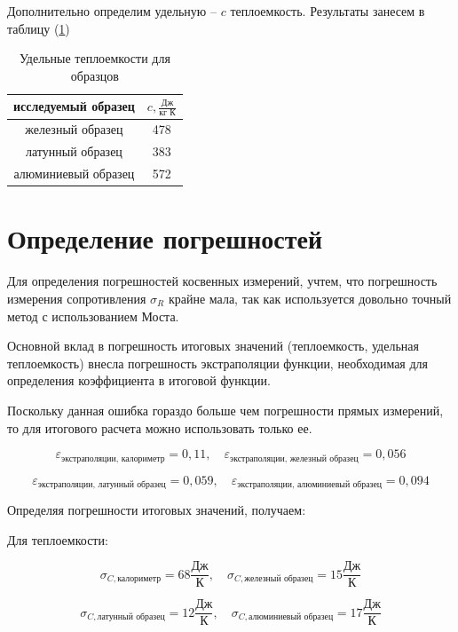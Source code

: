 \documentclass[12pt,a4paper]{article}
\begin{document}
	Дополнительно определим удельную -- $c$  теплоемкость. Результаты занесем в таблицу (\ref{tab:ud_capacity})
	
	\begin{table}[h!]
		\centering
		\begin{tabular}{|c|c|}
		\hline
		исследуемый образец & $c, \frac{\text{Дж}}{\text{кг К}}$ \\ \hline
		железный образец    & 478                           \\ \hline
		латунный образец    & 383                           \\ \hline
		алюминиевый образец & 572                           \\ \hline
		\end{tabular}
		\caption{Удельные теплоемкости для образцов}
		\label{tab:ud_capacity}
	\end{table}	
	
	\section{Определение погрешностей}
	
	Для определения погрешностей косвенных измерений, учтем, что погрешность измерения сопротивления $\sigma_{R}$ крайне мала, так как используется довольно точный метод с использованием Моста.
	
	Основной вклад в погрешность итоговых значений (теплоемкость, удельная теплоемкость) внесла погрешность экстраполяции функции, необходимая для определения коэффициента в итоговой функции.
	
	Поскольку данная ошибка гораздо больше чем погрешности прямых измерений, то для итогового расчета можно использовать только ее.
	
	\newpage
	
	$$\varepsilon_{\text{экстраполяции, калориметр}} = 0,11,\quad \varepsilon_{\text{экстраполяции, железный образец}} = 0,056$$
	
	$$\varepsilon_{\text{экстраполяции, латунный образец}} = 0,059, \quad \varepsilon_{\text{экстраполяции, алюминиевый образец}} = 0,094$$
	
	Определяя погрешности итоговых значений, получаем:
	
	Для теплоемкости:
	
	$$\sigma_{C, \text{калориметр}} = 68\frac{\text{Дж}}{\text{К}}, \quad \sigma_{C, \text{железный образец}} = 15\frac{\text{Дж}}{\text{К}}$$
	
	$$\sigma_{C, \text{латунный образец}} = 12\frac{\text{Дж}}{\text{К}}, \quad \sigma_{C, \text{алюминиевый образец}} = 17\frac{\text{Дж}}{\text{К}}$$
	
\end{document}
